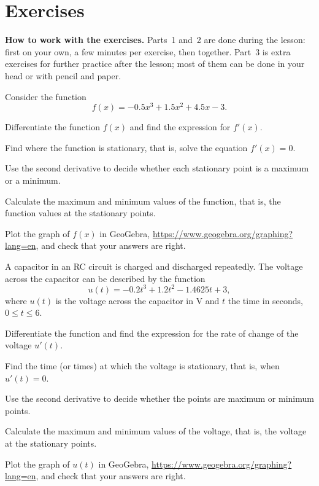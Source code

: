 
\section{Exercises}
\label{c13:sec:uppgifter}

\begin{aside}
\textbf{How to work with the exercises.} Parts~1 and~2 are done during the lesson: first on your
own, a few minutes per exercise, then together. Part~3 is extra exercises for further practice
after the lesson; most of them can be done in your head or with pencil and paper.

\end{aside}


Consider the function
\[
  f(x) = -0.5x^3 + 1.5x^2 + 4.5x - 3.
\]
\begin{parts}
  \item Differentiate the function $f(x)$ and find the expression for $f'(x)$.
  \item Find where the function is stationary, that is, solve the equation $f'(x) = 0$.
  \item Use the second derivative to decide whether each stationary point is a maximum or a
    minimum.
  \item Calculate the maximum and minimum values of the function, that is, the function values at
    the stationary points.
  \item Plot the graph of $f(x)$ in GeoGebra, \url{https://www.geogebra.org/graphing?lang=en}, and
    check that your answers are right.
\end{parts}

A capacitor in an RC circuit is charged and discharged repeatedly. The voltage across the
capacitor can be described by the function
\[
  u(t) = -0.2t^3 + 1.2t^2 - 1.4625t + 3,
\]
where $u(t)$ is the voltage across the capacitor in V and $t$ the time in seconds,
$0 \leq t \leq 6$.
\begin{parts}
  \item Differentiate the function and find the expression for the rate of change of the voltage
    $u'(t)$.
  \item Find the time (or times) at which the voltage is stationary, that is, when
    $u'(t) = 0$.
  \item Use the second derivative to decide whether the points are maximum or minimum points.
  \item Calculate the maximum and minimum values of the voltage, that is, the voltage at the
    stationary points.
  \item Plot the graph of $u(t)$ in GeoGebra, \url{https://www.geogebra.org/graphing?lang=en}, and
    check that your answers are right.
\end{parts}

